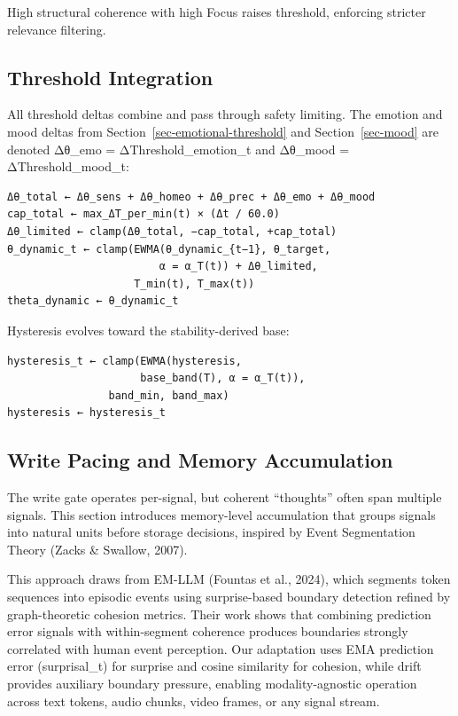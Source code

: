 \documentclass[
  letterpaper,
  DIV=11,
  numbers=noendperiod]{scrartcl}
\begin{document}
High structural coherence with high Focus raises threshold, enforcing
stricter relevance filtering.

\subsection{Threshold Integration}\label{threshold-integration}

All threshold deltas combine and pass through safety limiting. The
emotion and mood deltas from Section~\ref{sec-emotional-threshold} and
Section~\ref{sec-mood} are denoted Δθ\_emo = ΔThreshold\_emotion\_t and
Δθ\_mood = ΔThreshold\_mood\_t:

\begin{verbatim}
Δθ_total ← Δθ_sens + Δθ_homeo + Δθ_prec + Δθ_emo + Δθ_mood
cap_total ← max_ΔT_per_min(t) × (Δt / 60.0)
Δθ_limited ← clamp(Δθ_total, −cap_total, +cap_total)
θ_dynamic_t ← clamp(EWMA(θ_dynamic_{t−1}, θ_target,
                        α = α_T(t)) + Δθ_limited,
                    T_min(t), T_max(t))
theta_dynamic ← θ_dynamic_t
\end{verbatim}

Hysteresis evolves toward the stability-derived base:

\begin{verbatim}
hysteresis_t ← clamp(EWMA(hysteresis,
                     base_band(T), α = α_T(t)),
                band_min, band_max)
hysteresis ← hysteresis_t
\end{verbatim}

\subsection{Write Pacing and Memory
Accumulation}\label{sec-write-pacing}

The write gate operates per-signal, but coherent ``thoughts'' often span
multiple signals. This section introduces memory-level accumulation that
groups signals into natural units before storage decisions, inspired by
Event Segmentation Theory (Zacks \& Swallow, 2007).

This approach draws from EM-LLM (Fountas et al., 2024), which segments
token sequences into episodic events using surprise-based boundary
detection refined by graph-theoretic cohesion metrics. Their work shows
that combining prediction error signals with within-segment coherence
produces boundaries strongly correlated with human event perception. Our
adaptation uses EMA prediction error (surprisal\_t) for surprise and
cosine similarity for cohesion, while drift provides auxiliary boundary
pressure, enabling modality-agnostic operation across text tokens, audio
chunks, video frames, or any signal stream.
\end{document}
